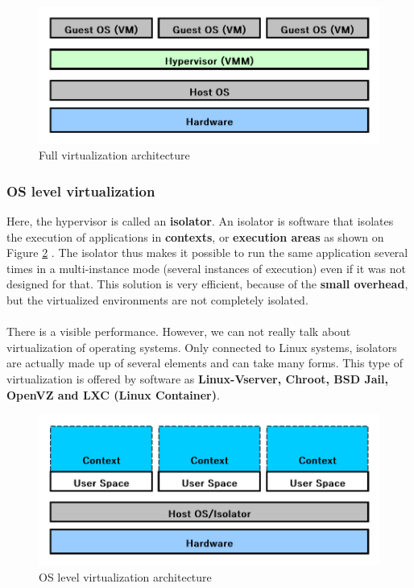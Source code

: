 \begin{figure}[!h]
    \centering
    \includegraphics[scale=0.65]{fig02/full-virtualization.pdf}
    \caption{Full virtualization architecture}
    \label{fig:full-virtualization}
\end{figure}

\subsubsection{OS level virtualization}
Here, the hypervisor is called an \textbf{isolator}. An isolator is software that isolates the execution of applications in \textbf{contexts}, or \textbf{execution areas} as shown on Figure \ref{fig:os-level-virtualization} . The isolator thus makes it possible to run the same application several times in a multi-instance mode (several instances of execution) even if it was not designed for that. This solution is very efficient, because of the \textbf{small overhead}, but the virtualized environments are not completely isolated.
\paragraph{} There is a visible performance. However, we can not really talk about virtualization of operating systems. Only connected to Linux systems, isolators are actually made up of several elements and can take many forms. This type of virtualization is offered by software as \textbf{Linux-Vserver, Chroot, BSD Jail, OpenVZ and LXC (Linux Container)}.

\begin{figure}[!h]
    \centering 
    \includegraphics[scale=0.65]{fig02/os-level-virtualization.pdf}
    \caption{OS level virtualization architecture}
    \label{fig:os-level-virtualization}
\end{figure}

